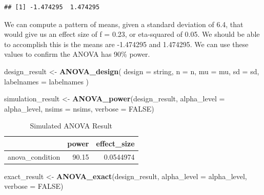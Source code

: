 \documentclass[]{book}
\newenvironment{Shaded}{\begin{snugshade}}{\end{snugshade}}
\newcommand{\DataTypeTok}[1]{\textcolor[rgb]{0.13,0.29,0.53}{#1}}
\newcommand{\KeywordTok}[1]{\textcolor[rgb]{0.13,0.29,0.53}{\textbf{#1}}}
\newcommand{\NormalTok}[1]{#1}
\newcommand{\OtherTok}[1]{\textcolor[rgb]{0.56,0.35,0.01}{#1}}
\newcommand{\StringTok}[1]{\textcolor[rgb]{0.31,0.60,0.02}{#1}}
\begin{document}
\begin{verbatim}
## [1] -1.474295  1.474295
\end{verbatim}

We can compute a pattern of means, given a standard deviation of 6.4, that would give us an effect size of f = 0.23, or eta-squared of 0.05. We should be able to accomplish this is the means are -1.474295 and 1.474295. We can use these values to confirm the ANOVA has 90\% power.

\begin{Shaded}
\begin{Highlighting}[]
\NormalTok{design_result <-}\StringTok{ }\KeywordTok{ANOVA_design}\NormalTok{(}
  \DataTypeTok{design =}\NormalTok{ string,}
  \DataTypeTok{n =}\NormalTok{ n,}
  \DataTypeTok{mu =}\NormalTok{ mu,}
  \DataTypeTok{sd =}\NormalTok{ sd,}
  \DataTypeTok{labelnames =}\NormalTok{ labelnames}
\NormalTok{  )}
\end{Highlighting}
\end{Shaded}

\begin{Shaded}
\begin{Highlighting}[]
\NormalTok{simulation_result <-}\StringTok{ }\KeywordTok{ANOVA_power}\NormalTok{(design_result, }
                                 \DataTypeTok{alpha_level =}\NormalTok{ alpha_level, }
                                 \DataTypeTok{nsims =}\NormalTok{ nsims,}
                                 \DataTypeTok{verbose =} \OtherTok{FALSE}\NormalTok{)}
\end{Highlighting}
\end{Shaded}

\begin{table}[!h]

\caption{\label{tab:unnamed-chunk-19}Simulated ANOVA Result}
\centering
\begin{tabular}{l|r|r}
\hline
  & power & effect\_size\\
\hline
anova\_condition & 90.15 & 0.0544974\\
\hline
\end{tabular}
\end{table}

\begin{Shaded}
\begin{Highlighting}[]
\NormalTok{exact_result <-}\StringTok{ }\KeywordTok{ANOVA_exact}\NormalTok{(design_result,}
                            \DataTypeTok{alpha_level =}\NormalTok{ alpha_level,}
                            \DataTypeTok{verbose =} \OtherTok{FALSE}\NormalTok{)}
\end{Highlighting}
\end{Shaded}
\end{document}
